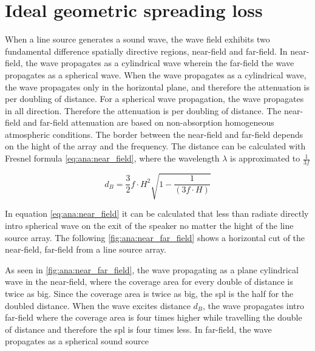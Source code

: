 \section{Ideal geometric spreading loss}\label{sec:ana:geo_spr_los}
When a line source generates a sound wave, the wave field exhibits two fundamental difference spatially directive regions, near-field and far-field. In near-field, the wave propagates as a cylindrical wave wherein the far-field the wave propagates as a spherical wave. When the wave propagates as a cylindrical wave, the wave propagates only in the horizontal plane, and therefore the attenuation is  per doubling of distance. For a spherical wave propagation, the wave propagates in all direction. Therefore the attenuation is  per doubling of distance. The near-field and far-field attenuation are based on non-absorption homogeneous atmospheric conditions. The border between the near-field and far-field depends on the hight of the array and the frequency. The distance can be calculated with Fresnel formula \autoref{eq:ana:near_field}, where the wavelength $\lambda$ is approximated to $\frac{1}{3f}$ \citep{bauman2001wavefront}

\begin{equation}\label{eq:ana:near_field}
d_{B} = \frac{3}{2}f \cdot H^{2}\sqrt{1-\frac{1}{(3f \cdot H)}}
\end{equation}

\startexplain
{}
\stopexplain

In equation \autoref{eq:ana:near_field} it can be calculated that less than  radiate directly intro spherical wave on the exit of the speaker no matter the hight of the line source array. The following \autoref{fig:ana:near_far_field} shows a horizontal cut of the near-field, far-field from a line source array. 


As seen in \autoref{fig:ana:near_far_field}, the wave propagating as a plane cylindrical wave in the near-field, where the coverage area for every double of distance is twice as big. Since the coverage area is twice as big, the \gls{spl} is the half for the doubled distance. When the wave excites distance $d_B$, the wave propagates intro far-field where the coverage area is four times higher while travelling the double of distance and therefore the \gls{spl} is four times less. In far-field, the wave propagates as a spherical sound source  

